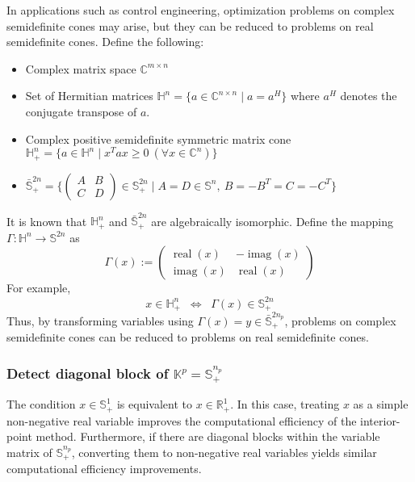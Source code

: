 In applications such as control engineering, optimization problems on complex semidefinite cones may arise, but they can be reduced to problems on real semidefinite cones.
Define the following:
\begin{itemize}
    \item Complex matrix space $\mathbb{C}^{m\times n}$
    \item Set of Hermitian matrices $\mathbb{H}^n=\{a \in \mathbb{C}^{n\times n} \mid a = a^H\}$ where $a^H$ denotes the conjugate transpose of $a$.
    \item Complex positive semidefinite symmetric matrix cone $\mathbb{H}^n_+=\{a \in \mathbb{H}^n \mid x^T a x \geq 0 ~(\forall x\in \mathbb{C}^n)\}$
    \item $\bar{\mathbb{S}}^{2n}_+ = \{(\begin{smallmatrix}
    A & B\\
    C & D
\end{smallmatrix}) \in \mathbb{S}^{2n}_+ \mid A=D\in \mathbb{S}^n, ~ B=-B^T=C=-C^T\}$
\end{itemize}
It is known that $\mathbb{H}^n_+$ and $\bar{\mathbb{S}}^{2n}_+$ are algebraically isomorphic.
Define the mapping $\Gamma: \mathbb{H}^n\to \mathbb{S}^{2n}$ as
\[
  \Gamma(x)
  := \begin{pmatrix}
       \operatorname{real}(x) & -\operatorname{imag}(x) \\
       \operatorname{imag}(x) & \operatorname{real}(x)
     \end{pmatrix}
\]
For example,
\[
  x\in \mathbb{H}^n_+
   \;\;\Longleftrightarrow\;\;
  \Gamma(x)\in \mathbb{S}^{2n}_+
\]
Thus, by transforming variables using $\Gamma(x)= y \in \bar{\mathbb{S}}^{2n_p}_+$, problems on complex semidefinite cones can be reduced to problems on real semidefinite cones.

\subsubsection{Detect diagonal block of $\mathbb{K}^p=\mathbb{S}^{n_p}_+$}

The condition $x\in \mathbb{S}^1_+$ is equivalent to $x\in \mathbb{R}^1_+$.
In this case, treating $x$ as a simple non-negative real variable improves the computational efficiency of the interior-point method.
Furthermore, if there are diagonal blocks within the variable matrix of $\mathbb{S}^{n_p}_+$, converting them to non-negative real variables yields similar computational efficiency improvements.

